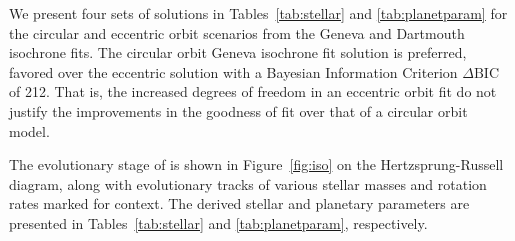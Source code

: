 \documentclass[apjl]{emulateapj}
\begin{document}
We present four sets of solutions in Tables~\ref{tab:stellar} and \ref{tab:planetparam} for the circular and eccentric orbit scenarios from the Geneva and Dartmouth isochrone fits. The circular orbit Geneva isochrone fit solution is preferred, favored over the eccentric solution with a Bayesian Information Criterion $\Delta \mathrm{BIC}$ of 212. That is, the increased degrees of freedom in an eccentric orbit fit do not justify the improvements in the goodness of fit over that of a circular orbit model.

The evolutionary stage of \hatcur{} is shown in Figure~\ref{fig:iso} on the Hertzsprung-Russell diagram, along with evolutionary tracks of various stellar masses and rotation rates marked for context. The derived stellar and planetary parameters are presented in Tables~\ref{tab:stellar} and \ref{tab:planetparam}, respectively. 


\end{document}
